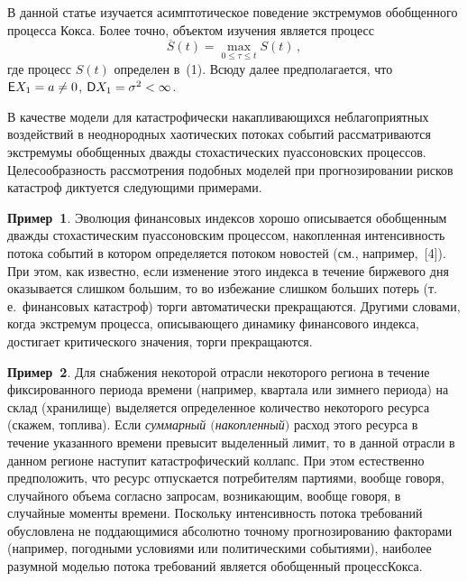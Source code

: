 \begin{multicols}{2}
В данной статье изучается асимптотическое поведение экстремумов
обобщенного процесса Кокса. Более точно, объектом изучения
является процесс
$$
\overline{S}(t) = \max_{0\leq\tau\leq t} S(t)\,,
$$
где процесс $S(t)$ определен в~(1). Всюду далее предполагается, что
${\sf E} X_1 = a \neq 0$, ${\sf D} X_1 = \sigma^2 < \infty$.

В качестве модели для катастрофически накапливающихся
неблагоприятных воздействий в неоднородных хаотических потоках
событий рас\-смат\-ри\-ва\-ют\-ся экстремумы обобщенных дважды\linebreak
стохастических пуассоновских процессов. Целесообразность
рассмотрения подобных моделей при прогнозировании рисков катастроф
диктуется следующими примерами.

\smallskip

\noindent
\textbf{Пример~1}. Эволюция финансовых индексов хорошо описывается
обобщенным дважды стохастическим пуассоновским процессом,
накопленная интенсивность потока событий в котором определяется
потоком новостей (см., например,~[4]). При этом, как известно,
если изменение этого индекса в течение биржевого дня оказывается
слишком большим, то во избежание слишком больших потерь (т.\,е.\
финансовых катастроф) торги автоматически прекращаются. Другими
словами, когда экстремум процесса, описывающего динамику
финансового индекса, достигает критического значения, торги
прекращаются.


\smallskip

\noindent
\textbf{Пример~2}. Для снабжения некоторой отрасли некоторого региона
в течение фиксированного периода времени (например, квартала или
зимнего периода) на склад (хранилище) выделяется определенное
количество некоторого ресурса (скажем, топлива). Если {\it
суммарный $($накопленный$)$} расход этого ресурса в течение
указанного времени превысит выделенный лимит, то в данной отрасли
в данном регионе наступит катастрофический коллапс. При этом
естественно предположить, что ресурс отпускается потребителям
партиями, вообще говоря, случайного объема согласно запросам,
возникающим, вообще говоря, в случайные моменты времени. Поскольку
интенсивность потока требований обусловлена не поддающимися
абсолютно точному прогнозированию факторами (например, погодными
условиями или политическими событиями), наиболее разумной моделью
потока требований является обобщенный процесс\linebreak Кокса.
{ %

}

\smallskip


\end{multicols}
